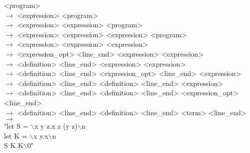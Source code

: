 \documentclass[12pt]{article}
\begin{document}
<program> \\
$\rightarrow$ <expression> <program> \\
$\rightarrow$ <expression> <expression> <program> \\
$\rightarrow$ <expression> <expression> <expression> <program> \\
$\rightarrow$ <expression> <expression> <expression> \\
$\rightarrow$ <expression\_opt> <line\_end> <expression> <expression> \\
$\rightarrow$ <definition> <line\_end> <expression> <expression> \\
$\rightarrow$ <definition> <line\_end> <expression\_opt> <line\_end> <expression> \\
$\rightarrow$ <definition> <line\_end> <definition> <line\_end> <expression> \\
$\rightarrow$ <definition> <line\_end> <definition> <line\_end> <expression\_opt> <line\_end> \\
$\rightarrow$ <definition> <line\_end> <definition> <line\_end> <term> <line\_end> \\
$\rightarrow$ \\
"let S = $\backslash$x y z.x z (y z)$\backslash$n \\
let K = $\backslash$x y.x$\backslash$n \\
S K K$\backslash$0"
\end{document}
